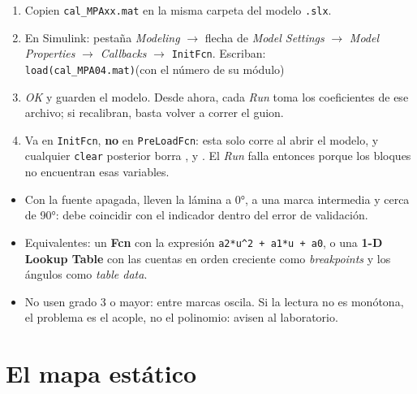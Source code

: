 \documentclass[11pt,letterpaper]{article}
\newcommand{\blq}[1]{\textsf{\textbf{#1}}}                 %
\newcommand{\sen}[1]{\texttt{\detokenize{#1}}}             %
\begin{document}
\begin{pasos}
\begin{enumerate}[leftmargin=14pt]
  \item Copien \texttt{cal\_MPAxx.mat} en la misma carpeta del modelo \texttt{.slx}.
  \item En Simulink: pestaña \emph{Modeling} $\to$ flecha de \emph{Model Settings} $\to$ \emph{Model Properties} $\to$ \emph{Callbacks} $\to$ \texttt{InitFcn}. Escriban:\\[2pt]
  \hspace*{8mm}\texttt{load(\textquotesingle cal\_MPA04.mat\textquotesingle)}\quad (con el número de su módulo)
  \item \emph{OK} y guarden el modelo. Desde ahora, cada \emph{Run} toma los coeficientes de ese archivo; si recalibran, basta volver a correr el guion.
  \item Va en \texttt{InitFcn}, \textbf{no} en \texttt{PreLoadFcn}: esta solo corre al abrir el modelo, y cualquier \texttt{clear} posterior borra \sen{a2}, \sen{a1} y \sen{a0}. El \emph{Run} falla entonces porque los bloques no encuentran esas variables.
\end{enumerate}
\end{pasos}

\begin{nota}
\begin{itemize}[leftmargin=12pt]
  \item Con la fuente apagada, lleven la lámina a 0°, a una marca intermedia y cerca de 90°: \sen{y_deg} debe coincidir con el indicador dentro del error de validación.
  \item Equivalentes: un \blq{Fcn} con la expresión \texttt{a2*u\textasciicircum2 + a1*u + a0}, o una \blq{1-D Lookup Table} con las cuentas en orden creciente como \emph{breakpoints} y los ángulos como \emph{table data}.
  \item No usen grado 3 o mayor: entre marcas oscila. Si la lectura no es monótona, el problema es el acople, no el polinomio: avisen al laboratorio.
\end{itemize}
\end{nota}

\section{El mapa estático}\label{sec:mapa}
\end{document}
